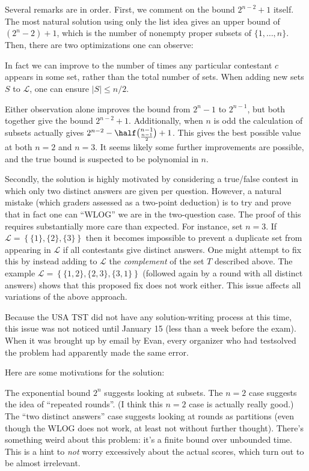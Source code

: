 \begin{remark*}
Several remarks are in order.
First, we comment on the bound $2^{n-2} + 1$ itself.
The most natural solution using only the
list idea gives an upper bound of $(2^n-2)+1$,
which is the number of nonempty proper subsets of $\{1, \dots, n\}$.
Then, there are two optimizations one can observe:
\begin{itemize}
  \ii In fact we can improve to the number of times
  any particular contestant $c$ appears in some set,
  rather than the total number of sets.
  \ii When adding new sets $S$ to $\mathcal L$, one can ensure $|S| \le n/2$.
\end{itemize}
Either observation alone improves the bound from $2^n-1$ to $2^{n-1}$,
but both together give the bound $2^{n-2} + 1$.
Additionally, when $n$ is odd the calculation of subsets
actually gives $2^{n-2} - \half \binom{n-1}{\frac{n-1}{2}} + 1$.
This gives the best possible value at both $n=2$ and $n=3$.
It seems likely some further improvements are possible,
and the true bound is suspected to be polynomial in $n$.

Secondly, the solution is highly motivated by considering a true/false contest
in which only two distinct answers are given per question.
However, a natural mistake (which graders assessed as a two-point deduction)
is to try and prove that in fact
one can ``WLOG'' we are in the two-question case.
The proof of this requires substantially more care than expected.
For instance, set $n = 3$.
If $\mathcal L = \left\{ \{1\}, \{2\}, \{3\}  \right\}$
then it becomes impossible to prevent a duplicate set from appearing
in $\mathcal L$ if all contestants give distinct answers.
One might attempt to fix this by instead adding to $\mathcal L$
the \emph{complement} of the set $T$ described above.
The example $\mathcal L = \left\{ \{1,2\}, \{2,3\}, \{3,1\}  \right\}$
(followed again by a round with all distinct answers)
shows that this proposed fix does not work either.
This issue affects all variations of the above approach.

Because the USA TST did not have any solution-writing process at this time,
this issue was not noticed until January 15 (less than a week before the exam).
When it was brought up by email by Evan,
every organizer who had testsolved the problem had apparently made the same error.
\end{remark*}
\begin{remark*}
  Here are some motivations for the solution:
  \begin{enumerate}
    \ii The exponential bound $2^n$ suggests looking at subsets.
    \ii The $n = 2$ case suggests the idea of ``repeated rounds''.
    (I think this $n=2$ case is actually really good.)
    \ii The ``two distinct answers'' case suggests looking at rounds
    as partitions (even though the WLOG does not work,
    at least not without further thought).
    \ii There's something weird about this problem:
    it's a finite bound over unbounded time.
    This is a hint to \emph{not} worry excessively about
    the actual scores, which turn out to be almost irrelevant.
  \end{enumerate}
\end{remark*}

